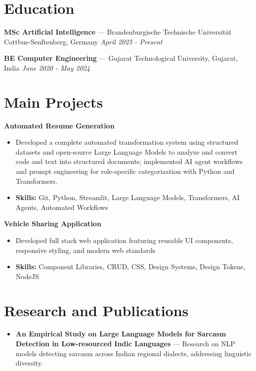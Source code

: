 \documentclass[a4paper,10pt]{article}
\begin{document}
\section*{Education}
\textbf{MSc Artificial Intelligence} — Brandenburgische Technische Universität Cottbus-Senftenberg, Germany \hfill \textit{April 2025 - Present}\par
\vspace{1.5pt}
\textbf{BE Computer Engineering} — Gujarat Technological University, Gujarat, India \hfill \textit{June 2020 - May 2024}\par

\section*{Main Projects}
\textbf{Automated Resume Generation}\par
\vspace{1pt}
\begin{itemize}
  \item Developed a complete automated transformation system using structured datasets and open-source Large Language Models to analyze and convert code and text into structured documents; implemented AI agent workflows and prompt engineering for role-specific categorization with Python and Transformers.
  \item \textbf{Skills:} Git, Python, Streamlit, Large Language Models, Transformers, AI Agents, Automated Workflows
\end{itemize}
\vspace{3pt}
\textbf{Vehicle Sharing Application}\par
\vspace{1pt}
\begin{itemize}
  \item Developed full stack web application featuring reusable UI components, responsive styling, and modern web standards
  \item \textbf{Skills:} Component Libraries, CRUD, CSS, Design Systems, Design Tokens, NodeJS
\end{itemize}

\section*{Research and Publications}
\begin{itemize}
\item \textbf{An Empirical Study on Large Language Models for Sarcasm Detection in Low-resourced Indic Languages} — Research on NLP models detecting sarcasm across Indian regional dialects, addressing linguistic diversity.
\end{itemize}
\end{document}
